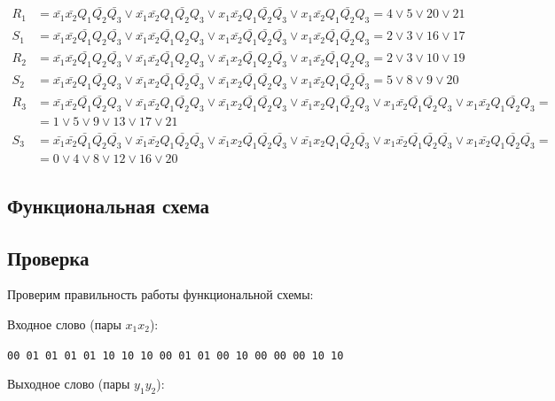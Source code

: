 \documentclass[listings]{labreport}
\begin{document}
\begin{align*}
R_1 & = \bar{x_1}\bar{x_2}Q_1\bar{Q_2}\bar{Q_3} \lor \bar{x_1}\bar{x_2}Q_1\bar{Q_2}Q_3 \lor x_1\bar{x_2}Q_1\bar{Q_2}\bar{Q_3} \lor x_1\bar{x_2}Q_1\bar{Q_2}Q_3 = 4 \lor 5 \lor 20 \lor 21 \\
S_1 & = \bar{x_1}\bar{x_2}\bar{Q_1}Q_2\bar{Q_3} \lor \bar{x_1}\bar{x_2}\bar{Q_1}Q_2Q_3 \lor x_1\bar{x_2}\bar{Q_1}\bar{Q_2}\bar{Q_3} \lor x_1\bar{x_2}\bar{Q_1}\bar{Q_2}Q_3 = 2 \lor 3 \lor 16 \lor 17 \\
R_2 & = \bar{x_1}\bar{x_2}\bar{Q_1}Q_2\bar{Q_3} \lor \bar{x_1}\bar{x_2}\bar{Q_1}Q_2Q_3 \lor \bar{x_1}x_2\bar{Q_1}Q_2\bar{Q_3} \lor x_1\bar{x_2}\bar{Q_1}Q_2Q_3 = 2 \lor 3 \lor 10 \lor 19 \\
S_2 & = \bar{x_1}\bar{x_2}Q_1\bar{Q_2}Q_3 \lor \bar{x_1}x_2\bar{Q_1}\bar{Q_2}\bar{Q_3} \lor \bar{x_1}x_2\bar{Q_1}\bar{Q_2}Q_3 \lor x_1\bar{x_2}Q_1\bar{Q_2}\bar{Q_3} = 5 \lor 8 \lor 9 \lor 20 \\
R_3 & = \bar{x_1}\bar{x_2}\bar{Q_1}\bar{Q_2}Q_3 \lor \bar{x_1}\bar{x_2}Q_1\bar{Q_2}Q_3 \lor \bar{x_1}x_2\bar{Q_1}\bar{Q_2}Q_3 \lor \bar{x_1}x_2Q_1\bar{Q_2}Q_3 \lor x_1\bar{x_2}\bar{Q_1}\bar{Q_2}Q_3 \lor x_1\bar{x_2}Q_1\bar{Q_2}Q_3 = \\ & = 1 \lor 5 \lor 9 \lor 13 \lor 17 \lor 21 \\
S_3 & = \bar{x_1}\bar{x_2}\bar{Q_1}\bar{Q_2}\bar{Q_3} \lor \bar{x_1}\bar{x_2}Q_1\bar{Q_2}\bar{Q_3} \lor \bar{x_1}x_2\bar{Q_1}\bar{Q_2}\bar{Q_3} \lor \bar{x_1}x_2Q_1\bar{Q_2}\bar{Q_3} \lor x_1\bar{x_2}\bar{Q_1}\bar{Q_2}\bar{Q_3} \lor x_1\bar{x_2}Q_1\bar{Q_2}\bar{Q_3} = \\ & = 0 \lor 4 \lor 8 \lor 12 \lor 16 \lor 20
\end{align*}

\subsection*{Функциональная схема}

\subsection*{Проверка}

Проверим правильность работы функциональной схемы:

Входное слово (пары $x_1x_2$):

\verb|00 01 01 01 01 10 10 10 00 01 01 00 10 00 00 00 10 10|

Выходное слово (пары $y_1y_2$):
\end{document}
